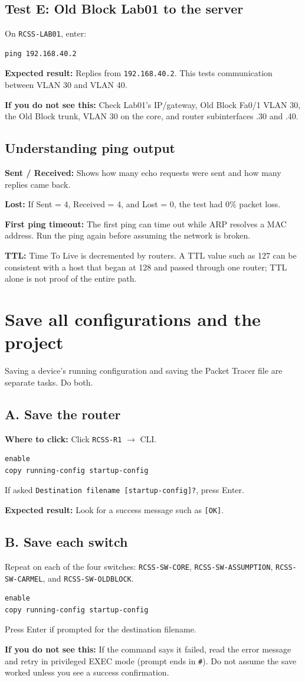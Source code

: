 \documentclass[11pt,a4paper]{article}
\newcommand{\clickpath}[1]{\noindent\colorbox{noteBG}{\parbox{0.96\linewidth}{\textbf{Where to click:} #1}}\par\vspace{5pt}}
\newcommand{\expected}[1]{\noindent\colorbox{noteBG}{\parbox{0.96\linewidth}{\textbf{Expected result:} #1}}\par\vspace{5pt}}
\newcommand{\ifnot}[1]{\noindent\colorbox{warnBG}{\parbox{0.96\linewidth}{\textbf{If you do not see this:} #1}}\par\vspace{5pt}}
\newcommand{\term}[2]{\noindent\textbf{#1:} #2\par\vspace{3pt}}
\begin{document}
\subsection*{Test E: Old Block Lab01 to the server}
On \texttt{RCSS-LAB01}, enter:
\begin{lstlisting}
ping 192.168.40.2
\end{lstlisting}
\expected{Replies from \texttt{192.168.40.2}. This tests communication between VLAN 30 and VLAN 40.}
\ifnot{Check Lab01's IP/gateway, Old Block Fa0/1 VLAN 30, the Old Block trunk, VLAN 30 on the core, and router subinterfaces .30 and .40.}

\subsection*{Understanding ping output}
\term{Sent / Received}{Shows how many echo requests were sent and how many replies came back.}
\term{Lost}{If Sent = 4, Received = 4, and Lost = 0, the test had 0\% packet loss.}
\term{First ping timeout}{The first ping can time out while ARP resolves a MAC address. Run the ping again before assuming the network is broken.}
\term{TTL}{Time To Live is decremented by routers. A TTL value such as 127 can be consistent with a host that began at 128 and passed through one router; TTL alone is not proof of the entire path.}

\section{Save all configurations and the project}\label{sec:save}
Saving a device's running configuration and saving the Packet Tracer file are separate tasks. Do both.

\subsection*{A. Save the router}
\clickpath{Click \texttt{RCSS-R1} \(\rightarrow\) CLI.}
\begin{lstlisting}
enable
copy running-config startup-config
\end{lstlisting}
If asked \texttt{Destination filename [startup-config]?}, press Enter.
\expected{Look for a success message such as \texttt{[OK]}.}

\subsection*{B. Save each switch}
Repeat on each of the four switches: \texttt{RCSS-SW-CORE}, \texttt{RCSS-SW-ASSUMPTION}, \texttt{RCSS-SW-CARMEL}, and \texttt{RCSS-SW-OLDBLOCK}.
\begin{lstlisting}
enable
copy running-config startup-config
\end{lstlisting}
Press Enter if prompted for the destination filename.
\ifnot{If the command says it failed, read the error message and retry in privileged EXEC mode (prompt ends in \texttt{\#}). Do not assume the save worked unless you see a success confirmation.}
\end{document}
